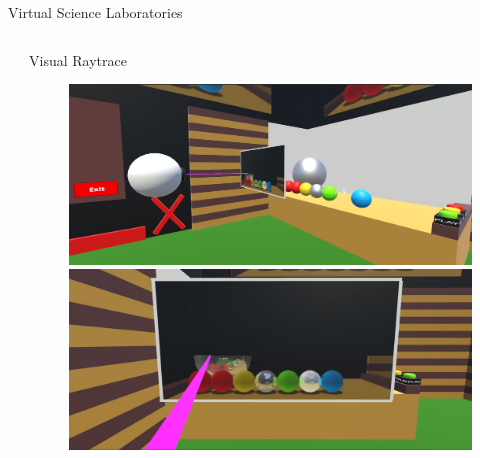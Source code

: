 \documentclass[final,hyperref={pdfpagelabels=false}]{beamer}
\begin{document}
\begin{frame}[t]
\begin{columns}[t]
\begin{column}{0.465\textwidth}
\begin{block}{Virtual Science Laboratories}
     
   
   
\end{block}


\end{column} %



\begin{column}{.025\textwidth}\end{column} %

\end{columns} %




\begin{columns}[t] %

\begin{column}{.025\textwidth}\end{column} %

\begin{column}{.96\textwidth} %


\begin{block}{Visual Raytrace}

    \begin{figure}
        \centering
        \includegraphics[width=0.49\linewidth]{duringProcess}
        \includegraphics[width=0.49\linewidth]{duringProcessEyeView}
       \end{figure}
       
	

\end{block}
\end{column}
\end{columns}
\end{frame}
\end{document}
